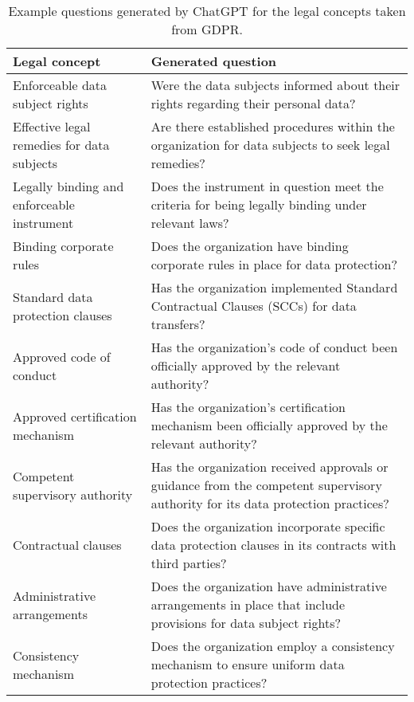 \documentclass{IOS-Book-Article}
\begin{document}
\begin{table}[htbp]
  \centering\begin{tabular}{l p{6cm}}
    \hline
    \textbf{Legal concept} & \textbf{Generated question} \\
    \hline
Enforceable data subject rights & Were the data subjects informed about their rights regarding their personal data?\\
\hline
Effective legal remedies for data subjects & Are there established procedures within the organization for data subjects to seek legal remedies?\\
\hline
Legally binding and enforceable instrument & Does the instrument in question meet the criteria for being legally binding under relevant laws?\\
\hline
Binding corporate rules & Does the organization have binding corporate rules in place for data protection?\\
\hline
Standard data protection clauses & Has the organization implemented Standard Contractual Clauses (SCCs) for data transfers?\\
\hline
Approved code of conduct & Has the organization's code of conduct been officially approved by the relevant authority?\\
\hline
Approved certification mechanism & Has the organization's certification mechanism been officially approved by the relevant authority?\\
\hline
Competent supervisory authority & Has the organization received approvals or guidance from the competent supervisory authority for its data protection practices?\\
\hline
Contractual clauses & Does the organization incorporate specific data protection clauses in its contracts with third parties?\\
\hline
Administrative arrangements & Does the organization have administrative arrangements in place that include provisions for data subject rights?\\
\hline
Consistency mechanism & Does the organization employ a consistency mechanism to ensure uniform data protection practices?\\
\hline

  \end{tabular}
  \caption{Example questions generated by ChatGPT for the legal concepts taken from GDPR.}
  \label{tab:question-examples}
\end{table}
\end{document}
